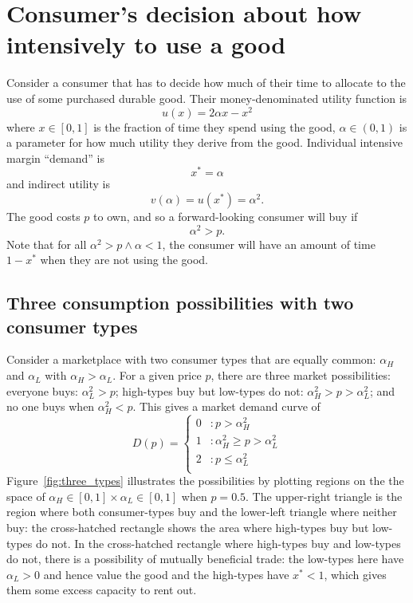 \documentclass[11pt]{article}
\begin{document}
\section{Consumer's decision about how intensively to use a good} 
Consider a consumer that has to decide how much of their time to allocate to the use of some purchased durable good. 
Their money-denominated utility function is
\begin{equation}
u(x) = 2 \alpha x - x^2  
\end{equation} 
where $x \in [0,1]$ is the fraction of time they spend using the good, $\alpha \in (0,1)$ is a parameter for how much utility they derive from the good. 
Individual intensive margin ``demand'' is  
\begin{equation}
x^* = \alpha  
\end{equation} 
and indirect utility is 
\begin{equation}
v(\alpha) = u(x^*) = \alpha^2.  
\end{equation} 
The good costs $p$ to own, and so a forward-looking consumer will buy if 
\begin{equation} 
\alpha^2 > p. 
\end{equation} 
Note that for all $\alpha^2 > p \wedge \alpha < 1$, the consumer will have an amount of time $1 - x^*$ when they are not using the good.

\subsection{Three consumption possibilities with two consumer types} 
Consider a marketplace with two consumer types that are equally common: $\alpha_H$ and $\alpha_L$ with $\alpha_H > \alpha_L$. 
For a given price $p$, there are three market possibilities: 
everyone buys: $\alpha_L^2 > p$; high-types buy but low-types do not: $\alpha_H^2 > p > \alpha_L^2$; and no one buys when $\alpha_H^2 < p$. 
This gives a market demand curve of 
\begin{equation}
   D(p) = \left\{
     \begin{array}{ll}
       0 & : p > \alpha_H^2\\
       1 & : \alpha_H^2 \ge p > \alpha_L^2  \\
       2 & : p \le \alpha_L^2  \\
     \end{array}
   \right.
\end{equation} 
Figure~\ref{fig:three_types} illustrates the possibilities by plotting regions on the the space of $\alpha_H \in [0,1] \times \alpha_L \in [0,1]$ when $p = 0.5$.  
The upper-right triangle is the region where both consumer-types buy and the lower-left triangle where neither buy: 
the cross-hatched rectangle shows the area where high-types buy but low-types do not. 
In the cross-hatched rectangle where high-types buy and low-types do not, there is a possibility of mutually beneficial trade:
the low-types here have $\alpha_L > 0$ and hence value the good and the high-types have $x^* < 1$, which gives them some excess capacity to rent out. 
\end{document}
